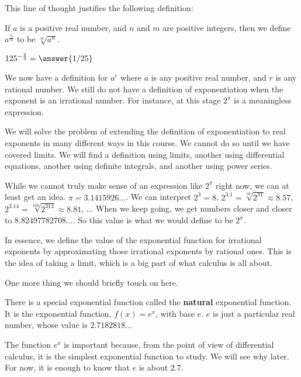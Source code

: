 \documentclass{ximera}
\begin{document}
This line of thought justifies the following definition:

\begin{definition}
If $a$ is a positive real number, and $n$ and $m$ are positive integers, then we define $a^{\frac{n}{m}}$ to be $\sqrt[m]{a^n}$.
\end{definition}

\begin{question}
	 $125^{-\frac{2}{3}} = \answer{1/25}$
\end{question}

We now have a definition for $a^r$ where $a$ is any positive real number, and $r$ is any rational number.  We still do not have a definition of exponentiation when the exponent is an irrational number.  For instance, at this stage $2^\pi$ is a meaningless expression.  

We will solve the problem of extending the definition of exponentiation to real exponents in many different ways in this course.  We cannot do so until we have covered limits.  We will find a definition using limits, another using differential equations,  another using definite integrals, and another using power series.

While we cannot truly make sense of an expression like $2^\pi$ right now, we can at least get an idea.  $\pi = 3.1415926...$.  We can interpret $2^3 = 8 $,  $2^{3.1} = \sqrt[10]{2^{31}} \approx 8.57$, $2^{3.14} = \sqrt[100]{2^{314}} \approx 8.81$, ...
When we keep going, we get numbers closer and closer to $8.82497782708...$.  So this value is what we would define to be $2^\pi$.

In essence, we define the value of the exponential function for irrational exponents by approximating those irrational exponents by rational ones.  This is the idea of taking a limit, which is a big part of what calculus is all about.

One more thing we should briefly touch on here.  

\begin{definition}
There is a special exponential function called the \textbf{natural} exponential function.  It is the exponential function, $f(x) = e^x$, with base $e$.  $e$ is just a particular real number, whose value is $2.7182818...$ 
\end{definition}

The function $e^x$ is important because, from the point of view of differential calculus, it is the simplest exponential function to study.  We will see why later.  For now, it is enough to know that $e$ is about $2.7$.
\end{document}
